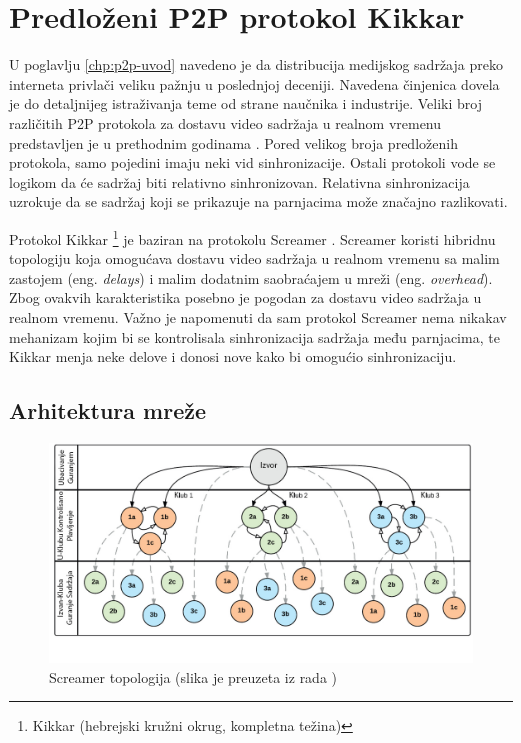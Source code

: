 \documentclass[12pt,oneside]{memoir}
\begin{document}
\chapter{Predloženi P2P protokol Kikkar}
\label{chp:p2p-protokol}
U poglavlju \ref{chp:p2p-uvod} navedeno je da distribucija medijskog sadržaja preko interneta privlači veliku pažnju u poslednjoj deceniji. Navedena činjenica dovela je do detaljnijeg istraživanja teme od strane naučnika i industrije. Veliki broj različitih P2P protokola za dostavu video sadržaja u realnom vremenu predstavljen je u prethodnim godinama \cite{Zhang:2012:SPL:2365364.2365643}. Pored velikog broja predloženih protokola, samo pojedini imaju neki vid sinhronizacije. Ostali protokoli vode se logikom da će sadržaj biti relativno sinhronizovan. Relativna sinhronizacija uzrokuje da se sadržaj koji se prikazuje na parnjacima može značajno razlikovati.


Protokol Kikkar \footnote{Kikkar (hebrejski kružni okrug, kompletna težina)} je baziran na protokolu Screamer \cite{cohenP2P}. Screamer koristi hibridnu topologiju koja omogućava dostavu video sadržaja u realnom vremenu sa malim zastojem (eng. \textit{delays}) i malim dodatnim saobraćajem u mreži (eng. \textit{overhead}). Zbog ovakvih karakteristika posebno je pogodan za dostavu video sadržaja u realnom vremenu. Važno je napomenuti da sam protokol Screamer nema nikakav mehanizam kojim bi se kontrolisala sinhronizacija sadržaja među parnjacima, te Kikkar menja neke delove i donosi nove kako bi omogućio sinhronizaciju.

\section{Arhitektura mreže}
\label{Kikkar.1}

\begin{figure}[!ht]
  \centering
  \includegraphics[width=1.05\textwidth]{slike/screamer-topology.jpg}
  \caption{Screamer topologija (slika je preuzeta iz rada \cite{ClubbingWithThePeers})}
  \label{fig:screamer-topologija}
\end{figure}
\par
\end{document}
